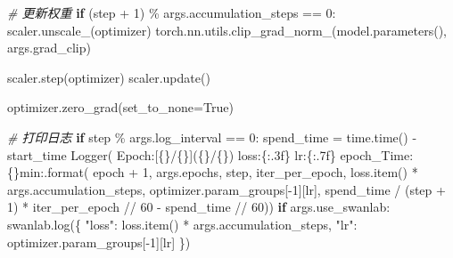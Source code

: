\documentclass[
]{article}
\newenvironment{Shaded}{}{}
\newcommand{\BuiltInTok}[1]{\textcolor[rgb]{0.00,0.50,0.00}{#1}}
\newcommand{\CommentTok}[1]{\textcolor[rgb]{0.38,0.63,0.69}{\textit{#1}}}
\newcommand{\ControlFlowTok}[1]{\textcolor[rgb]{0.00,0.44,0.13}{\textbf{#1}}}
\newcommand{\DecValTok}[1]{\textcolor[rgb]{0.25,0.63,0.44}{#1}}
\newcommand{\NormalTok}[1]{#1}
\newcommand{\OperatorTok}[1]{\textcolor[rgb]{0.40,0.40,0.40}{#1}}
\newcommand{\SpecialCharTok}[1]{\textcolor[rgb]{0.25,0.44,0.63}{#1}}
\newcommand{\StringTok}[1]{\textcolor[rgb]{0.25,0.44,0.63}{#1}}
\newcommand{\VariableTok}[1]{\textcolor[rgb]{0.10,0.09,0.49}{#1}}
\begin{document}
\begin{Shaded}
\begin{Highlighting}[]
        \CommentTok{\# 更新权重}
        \ControlFlowTok{if}\NormalTok{ (step }\OperatorTok{+} \DecValTok{1}\NormalTok{) }\OperatorTok{\%}\NormalTok{ args.accumulation\_steps }\OperatorTok{==} \DecValTok{0}\NormalTok{:}
\NormalTok{            scaler.unscale\_(optimizer)}
\NormalTok{            torch.nn.utils.clip\_grad\_norm\_(model.parameters(), args.grad\_clip)}

\NormalTok{            scaler.step(optimizer)}
\NormalTok{            scaler.update()}

\NormalTok{            optimizer.zero\_grad(set\_to\_none}\OperatorTok{=}\VariableTok{True}\NormalTok{)}

        \CommentTok{\# 打印日志}
        \ControlFlowTok{if}\NormalTok{ step }\OperatorTok{\%}\NormalTok{ args.log\_interval }\OperatorTok{==} \DecValTok{0}\NormalTok{:}
\NormalTok{            spend\_time }\OperatorTok{=}\NormalTok{ time.time() }\OperatorTok{{-}}\NormalTok{ start\_time}
\NormalTok{            Logger(}
                \StringTok{\textquotesingle{}Epoch:[}\SpecialCharTok{\{\}}\StringTok{/}\SpecialCharTok{\{\}}\StringTok{](}\SpecialCharTok{\{\}}\StringTok{/}\SpecialCharTok{\{\}}\StringTok{) loss:}\SpecialCharTok{\{:.3f\}}\StringTok{ lr:}\SpecialCharTok{\{:.7f\}}\StringTok{ epoch\_Time:}\SpecialCharTok{\{\}}\StringTok{min:\textquotesingle{}}\NormalTok{.}\BuiltInTok{format}\NormalTok{(}
\NormalTok{                    epoch }\OperatorTok{+} \DecValTok{1}\NormalTok{,}
\NormalTok{                    args.epochs,}
\NormalTok{                    step,}
\NormalTok{                    iter\_per\_epoch,}
\NormalTok{                    loss.item() }\OperatorTok{*}\NormalTok{ args.accumulation\_steps,}
\NormalTok{                    optimizer.param\_groups[}\OperatorTok{{-}}\DecValTok{1}\NormalTok{][}\StringTok{\textquotesingle{}lr\textquotesingle{}}\NormalTok{],}
\NormalTok{                    spend\_time }\OperatorTok{/}\NormalTok{ (step }\OperatorTok{+} \DecValTok{1}\NormalTok{) }\OperatorTok{*}\NormalTok{ iter\_per\_epoch }\OperatorTok{//} \DecValTok{60} \OperatorTok{{-}}\NormalTok{ spend\_time }\OperatorTok{//} \DecValTok{60}\NormalTok{))}
            \ControlFlowTok{if}\NormalTok{ args.use\_swanlab:}
\NormalTok{                swanlab.log(\{}
                    \StringTok{"loss"}\NormalTok{: loss.item() }\OperatorTok{*}\NormalTok{ args.accumulation\_steps,}
                    \StringTok{"lr"}\NormalTok{: optimizer.param\_groups[}\OperatorTok{{-}}\DecValTok{1}\NormalTok{][}\StringTok{\textquotesingle{}lr\textquotesingle{}}\NormalTok{]}
\NormalTok{                \})}


\end{Highlighting}
\end{Shaded}
\end{document}
